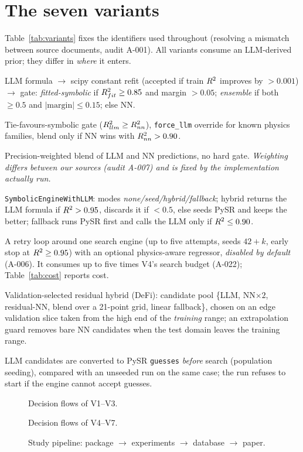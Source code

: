 \section{The seven variants}\label{sec:variants}
Table~\ref{tab:variants} fixes the identifiers used throughout (resolving a mismatch between source documents, audit A-001). All variants consume an LLM-derived prior; they differ in \emph{where} it enters.
\begin{table}[t]\centering\small{}\caption{Variants and baselines. Registry = index passed to the runner.}\label{tab:variants}\end{table}
\begin{description}\setlength\itemsep{0pt}
\item[V1] LLM formula $\to$ scipy constant refit (accepted if train $R^2$ improves by $>0.001$) $\to$ gate: \emph{fitted-symbolic} if $R^2_{fit}\ge0.85$ and margin $>0.05$; \emph{ensemble} if both $\ge0.5$ and $|\text{margin}|\le0.15$; else NN.
\item[V2] Tie-favours-symbolic gate ($R^2_{llm}\ge R^2_{nn}$), \texttt{force\_llm} override for known physics families, blend only if NN wins with $R^2_{nn}>0.90$.
\item[V3] Precision-weighted blend of LLM and NN predictions, no hard gate. \emph{Weighting differs between our sources (audit A-007) and is fixed by the implementation actually run.}
\item[V4] \texttt{SymbolicEngineWithLLM}: modes \emph{none/seed/hybrid/fallback}; hybrid returns the LLM formula if $R^2>0.95$, discards it if $<0.5$, else seeds PySR and keeps the better; fallback runs PySR first and calls the LLM only if $R^2\le0.90$.
\item[V5] A retry loop around one search engine (up to five attempts, seeds $42{+}k$, early stop at $R^2\ge0.95$) with an optional physics-aware regressor, \emph{disabled by default} (A-006). It consumes up to five times V4's search budget (A-022); Table~\ref{tab:cost} reports cost.
\item[V6] Validation-selected residual hybrid (DeFi): candidate pool \{LLM, NN$\times2$, residual-NN, blend over a 21-point grid, linear fallback\}, chosen on an edge validation slice taken from the high end of the \emph{training} range; an extrapolation guard removes bare NN candidates when the test domain leaves the training range.
\item[V7] LLM candidates are converted to PySR \texttt{guesses} \emph{before} search (population seeding), compared with an unseeded run on the same case; the run refuses to start if the engine cannot accept guesses.
\end{description}
\begin{figure}[t]\centering\caption{Decision flows of V1--V3.}\label{fig:flow1}\end{figure}
\begin{figure}[t]\centering\caption{Decision flows of V4--V7.}\label{fig:flow2}\end{figure}
\begin{figure}[t]\centering\caption{Study pipeline: package $\to$ experiments $\to$ database $\to$ paper.}\label{fig:pipeline}\end{figure}
